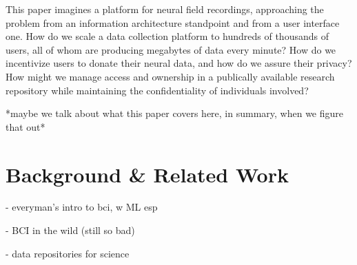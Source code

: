 \documentclass[a4paper,twoside]{article}
\begin{document}
This paper imagines a platform for neural field recordings, approaching the problem from an information architecture standpoint and from a user interface one. How do we scale a data collection platform to hundreds of thousands of users, all of whom are producing megabytes of data every minute? How do we incentivize users to donate their neural data, and how do we assure their privacy? How might we manage access and ownership in a publically available research repository while maintaining the confidentiality of individuals involved?

*maybe we talk about what this paper covers here, in summary, when we figure that out*






\section{Background \& Related Work}

- everyman's intro to bci, w ML esp

- BCI in the wild (still so bad)

- data repositories for science








% 
% 

\vfill

{\small
}

\vfill
\end{document}
